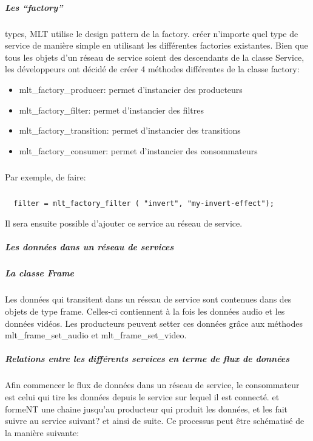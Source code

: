 \subparagraph{Les ``factory''}
types, MLT utilise le design pattern de la factory. %
créer n'importe quel type de service de manière simple en utilisant les
différentes factories existantes. Bien que tous les objets d'un réseau
de service soient des descendants de la classe Service, les développeurs
ont décidé de créer 4 méthodes différentes de la classe factory:

\begin{itemize}

  \item {mlt\_factory\_producer: permet d'instancier des producteurs}

  \item {mlt\_factory\_filter: permet d'instancier des filtres}

  \item {mlt\_factory\_transition: permet d'instancier des transitions}

  \item {mlt\_factory\_consumer: permet d'instancier des consommateurs}

\end{itemize}

\subparagraph{}

Par exemple, %
de faire:

\subparagraph{}

\begin{lstlisting}
  filter = mlt_factory_filter ( "invert", "my-invert-effect");
\end{lstlisting}

Il sera ensuite possible d'ajouter ce service au réseau de service.

\subparagraph{Les données dans un réseau de services}

\subparagraph{La classe Frame}

\subparagraph{}

Les données qui transitent dans un réseau de service sont contenues dans
des objets de type frame. Celles-ci contiennent à la fois les données
audio et les données vidéos. Les producteurs peuvent setter ces données
grâce aux méthodes mlt\_frame\_set\_audio et mlt\_frame\_set\_video.

\subparagraph{Relations entre les différents services en terme de flux
de données}

Afin commencer le flux de données dans un réseau de service, le
consommateur est celui qui tire les données depuis le service sur
lequel il est connecté.%
et formeNT une chaine jusqu'au producteur qui produit les données, et
les fait suivre au service suivant? et ainsi de suite. Ce processus peut
être schématisé de la manière suivante:

